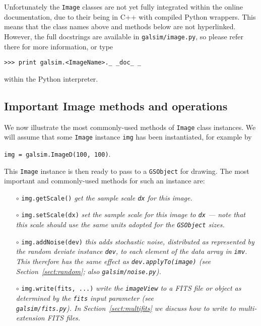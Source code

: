 \documentclass[preprint,11pt]{aastex}
\begin{document}
Unfortunately the \texttt{Image} classes are not yet fully integrated
within the online documentation, due to their being in C++
with compiled Python wrappers.  This means that the class names above
and methods below are not hyperlinked. 
However, the full docstrings are available in
\texttt{galsim/image.py}, so please refer there for more information,
or type

{\tt >>> print galsim.<ImageName>.\_\,\_doc\_\,\_}

within the Python interpreter.

\subsection{Important Image methods and operations}\label{sect:imagemethods}
We now illustrate the most commonly-used methods of \texttt{Image}
class instances.  We will assume that some \texttt{Image} instance \texttt{img} has been
instantiated, for example by

{\tt img = galsim.ImageD(100, 100)}.

This \texttt{Image} instance is then ready to pass to a \texttt{GSObject} for drawing.
The most important and commonly-used methods for such an
instance are:
\begin{itemize}

\item[$\circ$] \texttt{img.getScale()} \newline
 \emph{get the sample scale \texttt{dx} for this image.}

\item[$\circ$] \texttt{img.setScale(dx)} \newline
 \emph{set the sample scale for this image to \texttt{dx} --- note that
   this scale should use the same units adopted for the
   \texttt{GSObject} sizes.}

\item[$\circ$] \texttt{img.addNoise(dev)} \newline \emph{this adds stochastic noise, distributed as
  represented by the random deviate instance \texttt{dev}, to each
  element of the data array in \texttt{imv}.  This therefore has the same
  effect as \texttt{dev.applyTo(image)} (see Section~\ref{sect:random}; also \texttt{galsim/noise.py}).}

\item[$\circ$] \texttt{img.write(fits, ...)}  \newline  \emph{write the \texttt{imageView} to a FITS
    file or object as determined by the \texttt{fits} input parameter
    (see \\
  \texttt{galsim/fits.py}).  In Section~\ref{sect:multifits} we discuss how to write to multi-extension
  FITS files.}

\end{itemize}
\end{document}
